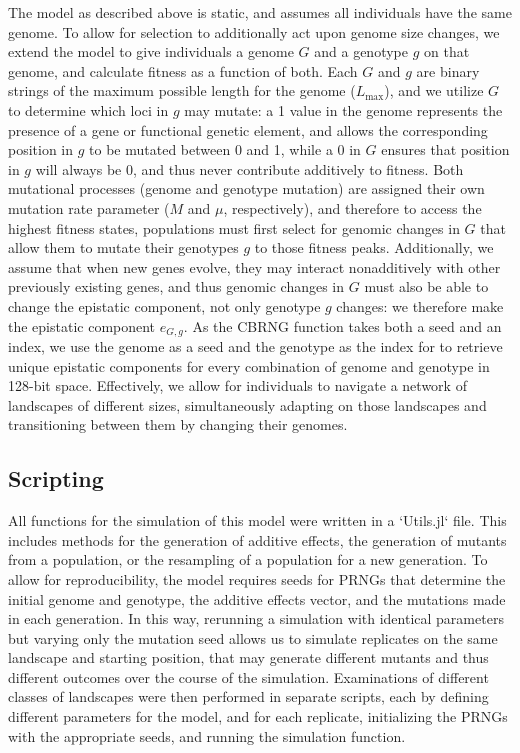 \documentclass[paper=a4, fontsize=11pt,twoside]{scrartcl}       %
\begin{document}
The model as described above is static, and assumes all individuals have the same genome. To allow for selection to additionally act upon genome size changes, we extend the model to give individuals a genome $G$ and a genotype $g$ on that genome, and calculate fitness as a function of both. Each $G$ and $g$ are binary strings of the maximum possible length for the genome ($L_{\text{max}}$), and we utilize $G$ to determine which loci in $g$ may mutate: a 1 value in the genome represents the presence of a gene or functional genetic element, and allows the corresponding position in $g$ to be mutated between 0 and 1, while a 0 in $G$ ensures that position in $g$ will always be 0, and thus never contribute additively to fitness. Both mutational processes (genome and genotype mutation) are assigned their own mutation rate parameter ($M$ and $\mu$, respectively), and therefore to access the highest fitness states, populations must first select for genomic changes in $G$ that allow them to mutate their genotypes $g$ to those fitness peaks. Additionally, we assume that when new genes evolve, they may interact nonadditively with other previously existing genes, and thus genomic changes in $G$ must also be able to change the epistatic component, not only genotype $g$ changes: we therefore make the epistatic component $e_{G,g}$. As the CBRNG function takes both a seed and an index, we use the genome as a seed and the genotype as the index for to retrieve unique epistatic components for every combination of genome and genotype in 128-bit space. Effectively, we allow for individuals to navigate a network of landscapes of different sizes, simultaneously adapting on those landscapes and transitioning between them by changing their genomes.

\subsection*{Scripting}

All functions for the simulation of this model were written in a `Utils.jl` file. This includes methods for the generation of additive effects, the generation of mutants from a population, or the resampling of a population for a new generation. To allow for reproducibility, the model requires seeds for PRNGs that determine the initial genome and genotype, the additive effects vector, and the mutations made in each generation. In this way, rerunning a simulation with identical parameters but varying only the mutation seed allows us to simulate replicates on the same landscape and starting position, that may generate different mutants and thus different outcomes over the course of the simulation. Examinations of different classes of landscapes were then performed in separate scripts, each by defining different parameters for the model, and for each replicate, initializing the PRNGs with the appropriate seeds, and running the simulation function.
\end{document}
